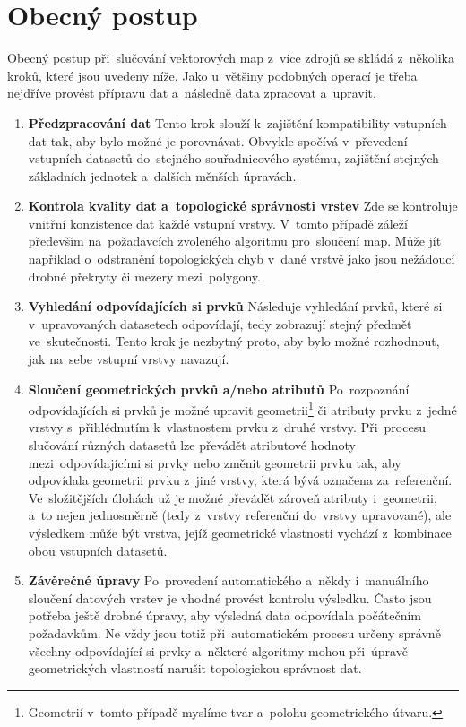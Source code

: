 \section{Obecný postup}
\label{postup}

Obecný postup při~slučování vektorových map z~více zdrojů se skládá z~několika
kroků, které jsou uvedeny níže. Jako u~většiny podobných operací je třeba 
nejdříve provést přípravu dat a~následně data zpracovat a~upravit.

\begin{enumerate}
  \item \textbf{Předzpracování dat}
    \subitem Tento krok slouží k~zajištění kompatibility vstupních dat tak, 
      aby bylo možné je porovnávat. Obvykle spočívá v~převedení vstupních 
      datasetů do~stejného souřadnicového systému, zajištění stejných 
      základních jednotek a~dalších měnších úpravách. 
  \item \textbf{Kontrola kvality dat a~topologické správnosti vrstev}
    \subitem Zde se kontroluje vnitřní konzistence dat každé vstupní vrstvy.
      V~tomto případě záleží především na~požadavcích zvoleného algoritmu 
      pro~sloučení map. Může jít například o~odstranění topologických chyb 
      v~dané vrstvě jako jsou nežádoucí drobné překryty či mezery 
      mezi~polygony.
  \item \textbf{Vyhledání odpovídajících si prvků}
      \subitem Následuje vyhledání prvků, které si v~upravovaných datasetech
      odpovídají, tedy zobrazují stejný předmět ve~skutečnosti. Tento krok je 
      nezbytný proto, aby bylo možné rozhodnout, jak na~sebe vstupní vrstvy 
      navazují.
  \item \textbf{Sloučení geometrických prvků a/nebo atributů}
      \subitem Po~rozpoznání odpovídajících si prvků je možné upravit 
      geometrii\footnote{Geometrií v~tomto případě myslíme tvar a~polohu 
      geometrického útvaru.} či atributy prvku z~jedné vrstvy s~přihlédnutím 
      k~vlastnostem prvku z~druhé vrstvy. Při~procesu slučování různých datasetů 
      lze převádět atributové hodnoty mezi~odpo\-vídajícími si prvky nebo změnit  
      geometrii prvku tak, aby odpovídala geometrii prvku z~jiné vrstvy, která 
      bývá označena za~referenční. Ve~slo\-ži\-tějších úlohách už je možné převádět 
      zároveň atributy i~geometrii, a~to nejen jednosměrně (tedy z~vrstvy referenční 
      do~vrstvy upravované), ale výsledkem může být vrstva, jejíž geometrické
      vlastnosti vychází z~kombinace obou vstupních datasetů.
  \item \textbf{Závěrečné úpravy}
      \subitem Po~provedení automatického a~někdy i~manuálního sloučení datových
      vrstev je vhodné provést kontrolu výsledku. Často jsou potřeba ještě drobné
      úpravy, aby výsledná data odpovídala počátečním požadavkům. Ne vždy jsou 
      totiž při~automatickém procesu určeny správně všechny odpovídající si prvky
      a~některé algoritmy mohou při~úpravě geometrických vlastností narušit 
      topologickou správnost dat.
\end{enumerate}
